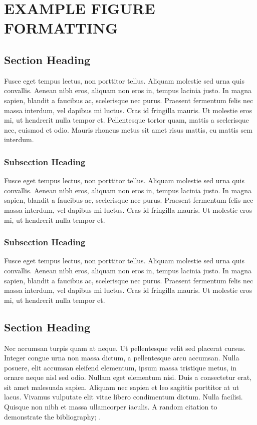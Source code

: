 \documentclass[../main.tex]{subfiles}
\begin{document}
\chapter{EXAMPLE FIGURE FORMATTING} \label{materials}

\section{Section Heading}

 Fusce eget tempus lectus, non porttitor tellus. Aliquam molestie sed urna quis convallis. Aenean nibh eros, aliquam non eros in, tempus lacinia justo. \cite{2008arXiv0807.1715B} In magna sapien, blandit a faucibus ac, scelerisque nec purus. Praesent fermentum felis nec massa interdum, vel dapibus mi luctus. Cras id fringilla mauris. Ut molestie eros mi, ut hendrerit nulla tempor et. Pellentesque tortor quam, mattis a scelerisque nec, euismod et odio. Mauris rhoncus metus sit amet risus mattis, eu mattis sem interdum.

\subsection{Subsection Heading}
Fusce eget tempus lectus, non porttitor tellus. Aliquam molestie sed urna quis convallis. Aenean nibh eros, aliquam non eros in, tempus lacinia justo. In magna sapien, blandit a faucibus ac, scelerisque nec purus. Praesent fermentum felis nec massa interdum, vel dapibus mi luctus. Cras id fringilla mauris. Ut molestie eros mi, ut hendrerit nulla tempor et.\cite{Rudin-UnitBallCN}

\subsection{Subsection Heading}
Fusce eget tempus lectus, non porttitor tellus. Aliquam molestie sed urna quis convallis. Aenean nibh eros, aliquam non eros in, tempus lacinia justo. In magna sapien, blandit a faucibus ac, scelerisque nec purus. Praesent fermentum felis nec massa interdum, vel dapibus mi luctus. Cras id fringilla mauris. Ut molestie eros mi, ut hendrerit nulla tempor et. \cite{Rudin-UnitBallCN}


\section{Section Heading}
Nec accumsan turpis quam at neque. Ut pellentesque velit sed placerat cursus. Integer congue urna non massa dictum, a pellentesque arcu accumsan. Nulla posuere, elit accumsan eleifend elementum, ipsum massa tristique metus, in ornare neque nisl sed odio. Nullam eget elementum nisi. Duis a consectetur erat, sit amet malesuada sapien. Aliquam nec sapien et leo sagittis porttitor at ut lacus. Vivamus vulputate elit vitae libero condimentum dictum. Nulla facilisi. Quisque non nibh et massa ullamcorper iaculis. A random citation to demonstrate the bibliography; \cite{ConwayCSV1}.
\end{document}
